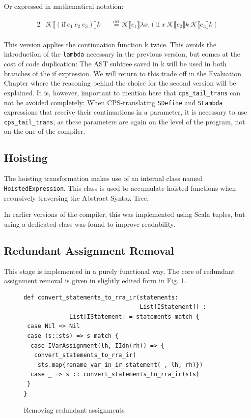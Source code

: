 \documentclass[11pt]{report}
\newcommand{\eqdef}{\stackrel{\text{def}}{=}}%
\newcommand{\cpstrans}[1]{\ensuremath{\mathcal{K}\llbracket #1 \rrbracket}}
\begin{document}
Or expressed in mathematical notation:

\begin{alignat*}{2}
&\cpstrans{(\text{if}\ e_1\ e_2\ e_3)} k &&\eqdef \cpstrans{e_1} \lambda x.(\text{if}\ x\ \cpstrans{e_2}k\ \cpstrans{e_3}k) \\
\end{alignat*}

This version applies the continuation function k twice. This avoids the introduction of the \texttt{lambda} necessary in the previous version, but comes at the cost of code duplication: The AST subtree saved in k will be used in both branches of the if expression. We will return to this trade off in the Evaluation Chapter where the reasoning behind the choice for the second version will be explained. It is, however, important to mention here that \texttt{cps_tail_trans} can not be avoided completely: When CPS-translating \texttt{SDefine} and \texttt{SLambda} expressions that receive their continuations in a parameter, it is necessary to use \texttt{cps_tail_trans}, as these parameters are again on the level of the program, not on the one of the compiler.


\subsection{Hoisting}
The hoisting transformation makes use of an internal class named \texttt{HoistedExpression}. This class is used to accumulate hoisted functions when recursively traversing the Abstract Syntax Tree.

In earlier versions of the compiler, this was implemented using Scala tuples, but using a dedicated class was found to improve readability. 



\subsection{Redundant Assignment Removal}
This stage is implemented in a purely functional way. The core of redundant assignment removal is given in slightly edited form in Fig. \ref{remredasign1}.

\begin{figure}[ht]
\begin{lstlisting}
def convert_statements_to_rra_ir(statements: 
                                 List[IStatement]) : 
             List[IStatement] = statements match {
 case Nil => Nil
 case (s::sts) => s match {
  case IVarAssignment(lh, IIdn(rh)) => {
   convert_statements_to_rra_ir(
    sts.map{rename_var_in_ir_statement(_, lh, rh)})
  case _ => s :: convert_statements_to_rra_ir(sts)
 }
}
\end{lstlisting}
\caption{Removing redundant assignments}
\label{remredasign1}
\end{figure}
\end{document}
